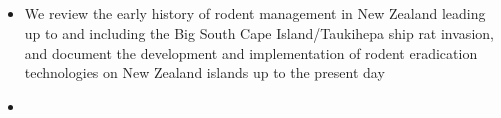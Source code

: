 \documentclass[document.tex]{subfiles}
\begin{document}
    \subsection{}
    \begin{itemize}
    \item We review the early history of rodent management in New Zealand leading
    up to and including the Big South Cape Island/Taukihepa ship rat invasion, and document the development
    and implementation of rodent eradication technologies on New Zealand islands up to the present day
    \item 
    \end{itemize}

\bib{}
    
\end{document}
